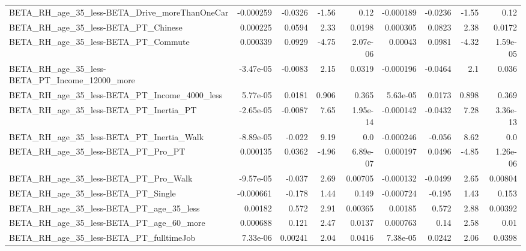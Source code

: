 \begin{tabular}{lrrrrrrrr}
BETA\_RH\_age\_35\_less-BETA\_Drive\_moreThanOneCar      &   -0.000259 &      -0.0326 &    -1.56 &     0.12 &  -0.000189 &     -0.0236 &        -1.55 &          0.12 \\
BETA\_RH\_age\_35\_less-BETA\_PT\_Chinese                &    0.000225 &       0.0594 &     2.33 &   0.0198 &   0.000305 &      0.0823 &         2.38 &        0.0172 \\
BETA\_RH\_age\_35\_less-BETA\_PT\_Commute                &    0.000339 &       0.0929 &    -4.75 & 2.07e-06 &    0.00043 &      0.0981 &        -4.32 &      1.59e-05 \\
BETA\_RH\_age\_35\_less-BETA\_PT\_Income\_12000\_more      &   -3.47e-05 &      -0.0083 &     2.15 &   0.0319 &  -0.000196 &     -0.0464 &          2.1 &         0.036 \\
BETA\_RH\_age\_35\_less-BETA\_PT\_Income\_4000\_less       &    5.77e-05 &       0.0181 &    0.906 &    0.365 &   5.63e-05 &      0.0173 &        0.898 &         0.369 \\
BETA\_RH\_age\_35\_less-BETA\_PT\_Inertia\_PT             &   -2.65e-05 &      -0.0087 &     7.65 & 1.95e-14 &  -0.000142 &     -0.0432 &         7.28 &      3.36e-13 \\
BETA\_RH\_age\_35\_less-BETA\_PT\_Inertia\_Walk           &   -8.89e-05 &       -0.022 &     9.19 &      0.0 &  -0.000246 &      -0.056 &         8.62 &           0.0 \\
BETA\_RH\_age\_35\_less-BETA\_PT\_Pro\_PT                 &    0.000135 &       0.0362 &    -4.96 & 6.89e-07 &   0.000197 &      0.0496 &        -4.85 &      1.26e-06 \\
BETA\_RH\_age\_35\_less-BETA\_PT\_Pro\_Walk               &   -9.57e-05 &       -0.037 &     2.69 &  0.00705 &  -0.000132 &     -0.0499 &         2.65 &       0.00804 \\
BETA\_RH\_age\_35\_less-BETA\_PT\_Single                 &   -0.000661 &       -0.178 &     1.44 &    0.149 &  -0.000724 &      -0.195 &         1.43 &         0.153 \\
BETA\_RH\_age\_35\_less-BETA\_PT\_age\_35\_less            &     0.00182 &        0.572 &     2.91 &  0.00365 &    0.00185 &       0.572 &         2.88 &       0.00392 \\
BETA\_RH\_age\_35\_less-BETA\_PT\_age\_60\_more            &    0.000688 &        0.121 &     2.47 &   0.0137 &   0.000763 &        0.14 &         2.58 &          0.01 \\
BETA\_RH\_age\_35\_less-BETA\_PT\_fulltimeJob            &    7.33e-06 &      0.00241 &     2.04 &   0.0416 &   7.38e-05 &      0.0242 &         2.06 &        0.0398 \\

\end{tabular}
